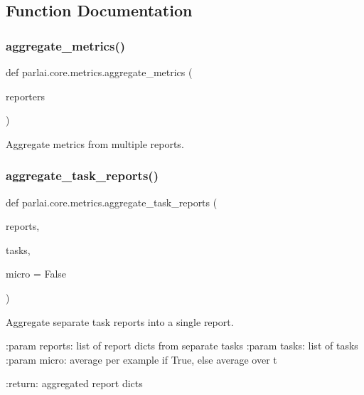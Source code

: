 \subsection{Function Documentation}
\mbox{\label{namespaceparlai_1_1core_1_1metrics_aa4ed5491962e06684b235fffe1b20fec}} 
\subsubsection{\texorpdfstring{aggregate\+\_\+metrics()}{aggregate\_metrics()}}
{\footnotesize\ttfamily def parlai.\+core.\+metrics.\+aggregate\+\_\+metrics (\begin{DoxyParamCaption}\item[{}]{reporters }\end{DoxyParamCaption})}

\begin{DoxyVerb}Aggregate metrics from multiple reports.
\end{DoxyVerb}
 \mbox{\label{namespaceparlai_1_1core_1_1metrics_ae323045c05ed03d93c260521ebb8bf71}} 
\subsubsection{\texorpdfstring{aggregate\+\_\+task\+\_\+reports()}{aggregate\_task\_reports()}}
{\footnotesize\ttfamily def parlai.\+core.\+metrics.\+aggregate\+\_\+task\+\_\+reports (\begin{DoxyParamCaption}\item[{}]{reports,  }\item[{}]{tasks,  }\item[{}]{micro = {\ttfamily False} }\end{DoxyParamCaption})}

\begin{DoxyVerb}Aggregate separate task reports into a single report.

:param reports: list of report dicts from separate tasks
:param tasks: list of tasks
:param micro: average per example if True, else average over t

:return: aggregated report dicts
\end{DoxyVerb}
 \mbox{\label{namespaceparlai_1_1core_1_1metrics_ae7769a6b628f41081e0f43043d52031a}} 
